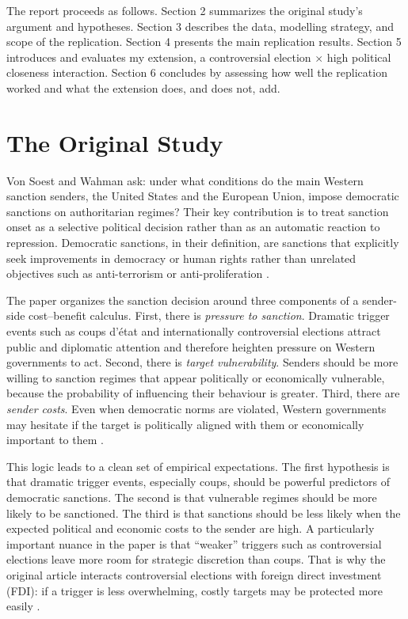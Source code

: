 \documentclass[12pt,letterpaper]{article}
\begin{document}
	The report proceeds as follows. Section 2 summarizes the original study's argument and hypotheses. Section 3 describes the data, modelling strategy, and scope of the replication. Section 4 presents the main replication results. Section 5 introduces and evaluates my extension, a controversial election $\times$ high political closeness interaction. Section 6 concludes by assessing how well the replication worked and what the extension does, and does not, add.
	
	\section{The Original Study}
	
	
	Von Soest and Wahman ask: under what conditions do the main Western sanction senders, the United States and the European Union, impose democratic sanctions on authoritarian regimes? Their key contribution is to treat sanction onset as a selective political decision rather than as an automatic reaction to repression. Democratic sanctions, in their definition, are sanctions that explicitly seek improvements in democracy or human rights rather than unrelated objectives such as anti-terrorism or anti-proliferation \citep{vonsoestNotAllDictators2015}.
	
	The paper organizes the sanction decision around three components of a sender-side cost--benefit calculus. First, there is \emph{pressure to sanction}. Dramatic trigger events such as coups d'\'etat and internationally controversial elections attract public and diplomatic attention and therefore heighten pressure on Western governments to act. Second, there is \emph{target vulnerability}. Senders should be more willing to sanction regimes that appear politically or economically vulnerable, because the probability of influencing their behaviour is greater. Third, there are \emph{sender costs}. Even when democratic norms are violated, Western governments may hesitate if the target is politically aligned with them or economically important to them \citep{vonsoestNotAllDictators2015}.
	
	This logic leads to a clean set of empirical expectations. The first hypothesis is that dramatic trigger events, especially coups, should be powerful predictors of democratic sanctions. The second is that vulnerable regimes should be more likely to be sanctioned. The third is that sanctions should be less likely when the expected political and economic costs to the sender are high. A particularly important nuance in the paper is that ``weaker'' triggers such as controversial elections leave more room for strategic discretion than coups. That is why the original article interacts controversial elections with foreign direct investment (FDI): if a trigger is less overwhelming, costly targets may be protected more easily \citep{vonsoestNotAllDictators2015}.
\end{document}
